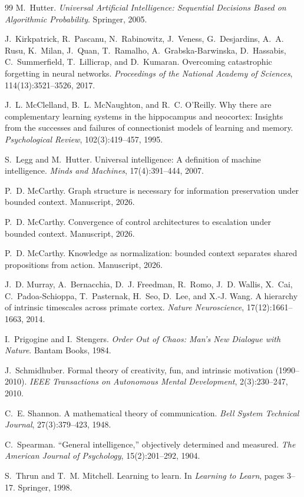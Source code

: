 \documentclass[11pt]{article}
\theoremstyle{definition}
\theoremstyle{remark}
\begin{document}
\begin{thebibliography}{99}
M.~Hutter.
\newblock \emph{Universal Artificial Intelligence: Sequential Decisions Based
  on Algorithmic Probability}.
\newblock Springer, 2005.

J.~Kirkpatrick, R.~Pascanu, N.~Rabinowitz, J.~Veness, G.~Desjardins,
  A.~A. Rusu, K.~Milan, J.~Quan, T.~Ramalho, A.~Grabska-Barwinska,
  D.~Hassabis, C.~Summerfield, T.~Lillicrap, and D.~Kumaran.
\newblock Overcoming catastrophic forgetting in neural networks.
\newblock \emph{Proceedings of the National Academy of Sciences},
  114(13):3521--3526, 2017.

J.~L. McClelland, B.~L. McNaughton, and R.~C. O'Reilly.
\newblock Why there are complementary learning systems in the hippocampus
  and neocortex: Insights from the successes and failures of connectionist
  models of learning and memory.
\newblock \emph{Psychological Review}, 102(3):419--457, 1995.

S.~Legg and M.~Hutter.
\newblock Universal intelligence: A definition of machine intelligence.
\newblock \emph{Minds and Machines}, 17(4):391--444, 2007.

P.~D. McCarthy.
\newblock Graph structure is necessary for information preservation under
  bounded context.
\newblock Manuscript, 2026.

P.~D. McCarthy.
\newblock Convergence of control architectures to escalation under bounded
  context.
\newblock Manuscript, 2026.

P.~D. McCarthy.
\newblock Knowledge as normalization: bounded context separates shared
  propositions from action.
\newblock Manuscript, 2026.

J.~D. Murray, A.~Bernacchia, D.~J. Freedman, R.~Romo, J.~D. Wallis,
  X.~Cai, C.~Padoa-Schioppa, T.~Pasternak, H.~Seo, D.~Lee, and
  X.-J. Wang.
\newblock A hierarchy of intrinsic timescales across primate cortex.
\newblock \emph{Nature Neuroscience}, 17(12):1661--1663, 2014.

I.~Prigogine and I.~Stengers.
\newblock \emph{Order Out of Chaos: Man's New Dialogue with Nature}.
\newblock Bantam Books, 1984.

J.~Schmidhuber.
\newblock Formal theory of creativity, fun, and intrinsic motivation
  (1990--2010).
\newblock \emph{IEEE Transactions on Autonomous Mental Development},
  2(3):230--247, 2010.

C.~E. Shannon.
\newblock A mathematical theory of communication.
\newblock \emph{Bell System Technical Journal}, 27(3):379--423, 1948.

C.~Spearman.
\newblock ``General intelligence,'' objectively determined and measured.
\newblock \emph{The American Journal of Psychology}, 15(2):201--292, 1904.

S.~Thrun and T.~M. Mitchell.
\newblock Learning to learn.
\newblock In \emph{Learning to Learn}, pages 3--17. Springer, 1998.

\end{thebibliography}
\end{document}
